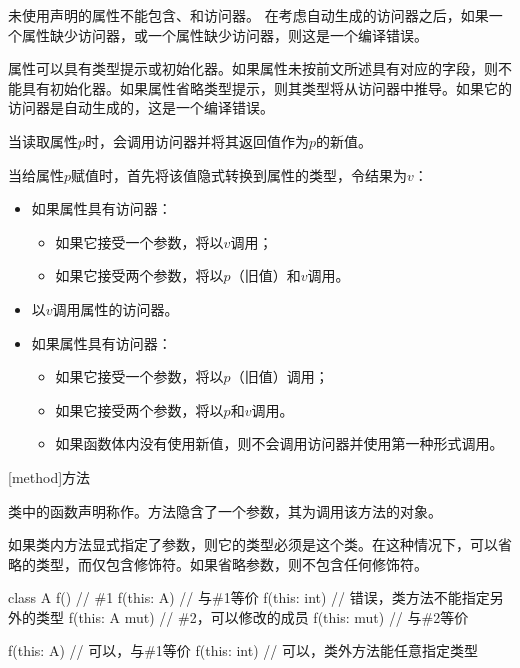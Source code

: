 \pnum
未使用声明的属性不能包含、和访问器。
在考虑自动生成的访问器之后，如果一个属性缺少访问器，或一个属性缺少访问器，则这是一个编译错误。

\pnum
属性可以具有类型提示或初始化器。如果属性未按前文所述具有对应的字段，则不能具有初始化器。如果属性省略类型提示，则其类型将从访问器中推导。如果它的访问器是自动生成的，这是一个编译错误。

\pnum
当读取属性$p$时，会调用访问器并将其返回值作为$p$的新值。

\pnum
当给属性$p$赋值时，首先将该值隐式转换到属性的类型，令结果为$v$：

\begin{itemize}
    \item 如果属性具有访问器：
    \begin{itemize}
        \item 如果它接受一个参数，将以$v$调用；
        \item 如果它接受两个参数，将以$p$（旧值）和$v$调用。
    \end{itemize}
    \item 以$v$调用属性的访问器。
    \item 如果属性具有访问器：
    \begin{itemize}
        \item 如果它接受一个参数，将以$p$（旧值）调用；
        \item 如果它接受两个参数，将以$p$和$v$调用。
        \item 如果函数体内没有使用新值，则不会调用访问器并使用第一种形式调用。
    \end{itemize}
\end{itemize}

[method]{方法}

\pnum
类中的函数声明称作。方法隐含了一个参数，其为调用该方法的对象。

\pnum
如果类内方法显式指定了参数，则它的类型必须是这个类。在这种情况下，可以省略的类型，而仅包含修饰符。如果省略参数，则不包含任何修饰符。

\enterexample
\begin{codeblock}
class A {
    f() { } // \#1
    f(this: A) { } // 与\#1等价
    f(this: int) { } // 错误，类方法不能指定另外的类型
    f(this: A mut) { } // \#2，可以修改的成员
    f(this: mut) { } // 与\#2等价
}

f(this: A) { } // 可以，与\#1等价
f(this: int) { } // 可以，类外方法能任意指定类型
\end{codeblock}
\exitexample

